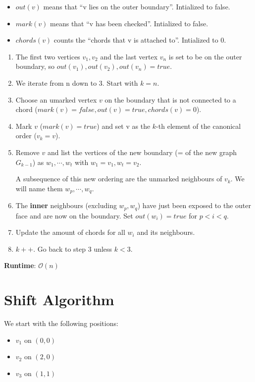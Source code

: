 \documentclass[10pt,a4paper]{article}
\begin{document}
\begin{itemize}
    \item $out(v)$ means that \enquote{v lies on the outer boundary}.
        Intialized to false.
    \item $mark(v)$ means that \enquote{v has been checked}.
        Intialized to false.
    \item $chords(v)$ counts the \enquote{chords that v is attached to}.
        Intialized to 0.
\end{itemize}


\begin{enumerate}
    \item The first two vertices $v_1, v_2$ and the last vertex $v_n$ is set
        to be on the outer boundary, so $out(v_1), out(v_2), out(v_n) = true$.
    \item We iterate from n down to 3.
        Start with $k = n$.
    \item Choose an umarked vertex $v$ on the boundary that is not connected to
        a chord ($mark(v) = false, out(v) = true, chords(v) = 0$).
    \item Mark $v$ ($mark(v) = true$) and set v as the $k$-th element of the
        canonical order ($v_k = v$).
    \item Remove $v$ and list the vertices of the new boundary (= of the new
        graph $G_{k-1}$) as $w_1, \cdots, w_t$ with $w_1 = v_1, w_t = v_2$.

        A subsequence of this new ordering are the unmarked neighbours of
        $v_k$.
        We will name them $w_p, \cdots, w_q$.
    \item The \textbf{inner} neighbours (excluding $w_p, w_q$) have just been
        exposed to the outer face and are now on the boundary.
        Set $out(w_i) = true$ for $p < i < q$.
    \item Update the amount of chords for all $w_i$ and its neighbours.
    \item $k++$. Go back to step 3 unless $k<3$.
\end{enumerate}

\textbf{Runtime}: $\mathcal{O}(n)$

\section{Shift Algorithm}

We start with the following positions:

\begin{itemize}
    \item $v_1$ on $(0,0)$
    \item $v_2$ on $(2,0)$
    \item $v_3$ on $(1,1)$
\end{itemize}
\end{document}

